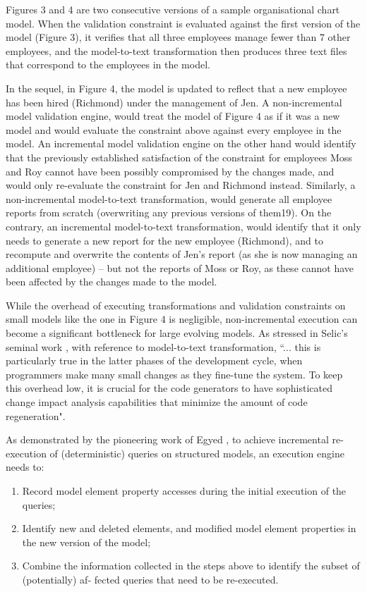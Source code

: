 \documentclass{llncs}
\begin{document}
Figures 3 and 4 are two consecutive versions of a sample organisational chart model. When the validation constraint is evaluated against the first version of the model (Figure 3), it verifies that all three employees manage fewer than 7 other employees, and the model-to-text transformation then produces three text files that correspond to the employees in the model.

In the sequel, in Figure 4, the model is updated to reflect that a new employee has been hired
(Richmond) under the management of Jen. A non-incremental model validation engine, would treat the model of Figure 4 as if it was a new model and would evaluate the constraint above against every employee in the model. An incremental model validation engine on the other hand would identify that the previously established satisfaction of the constraint for employees Moss and Roy cannot have been possibly compromised by the changes made, and would only re-evaluate the constraint for Jen and Richmond instead. Similarly, a non-incremental model-to-text transformation, would generate all employee reports from scratch (overwriting any previous versions of them19). On the contrary, an incremental model-to-text transformation, would identify that it only needs to generate a new report for the new employee (Richmond), and to recompute and overwrite the contents of Jen’s report (as she is now managing an additional employee) – but not the reports of Moss or Roy, as these cannot have been affected by the changes made to the model.

While the overhead of executing transformations and validation constraints on small models like the one in Figure 4 is negligible, non-incremental execution can become a significant bottleneck for large evolving models. As stressed in Selic’s seminal work \cite{selic2003pragmatics}, with reference to model-to-text transformation, ``... this is particularly true in the latter phases of the development cycle, when programmers make many small changes as they fine-tune the system. To keep this overhead low, it is crucial for the code generators to have sophisticated change impact analysis capabilities that minimize the amount of code regeneration".

As demonstrated by the pioneering work of Egyed \cite{egyed2011automatically}, to achieve incremental re-execution of (deterministic) queries on structured models, an execution engine needs to:

\begin{enumerate}
\item Record model element property accesses during the initial execution of the queries;
\item Identify new and deleted elements, and modified model element properties in the new version
of the model;
\item Combine the information collected in the steps above to identify the subset of (potentially) af-
fected queries that need to be re-executed.
\end{enumerate}
\end{document}

